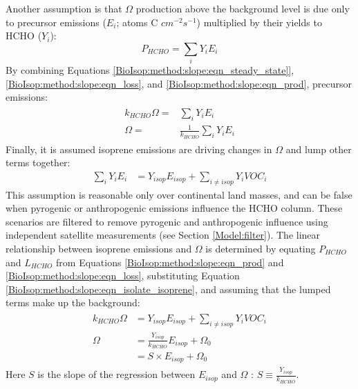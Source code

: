     Another assumption is that $\Omega$ production above the background level is due only to precursor emissions ($E_i$; atoms C $cm^{-2} s^{-1}$) multiplied by their yields to HCHO ($Y_i$):
    \begin{equation}
      \label{BioIsop:method:slope:eqn_prod}
      P_{HCHO}  = \sum_i Y_i E_i 
    \end{equation}
    By combining Equations \ref{BioIsop:method:slope:eqn_steady_state]}, \ref{BioIsop:method:slope:eqn_loss}, and \ref{BioIsop:method:slope:eqn_prod},  precursor emissions:
    \begin{eqnarray} \begin{split}
      k_{HCHO} \Omega = & \sum_i Y_i E_i \\
      \Omega = & \frac{1}{k_{HCHO}} \sum_i Y_i E_i
    \end{split} \end{eqnarray}
    Finally, it is assumed isoprene emissions are driving changes in $\Omega$ \parencite[as assumed elsewhere, e.g.,][]{Palmer2003,Millet2008,Marais2014,Stavrakou2015} and lump other terms together:
    \begin{eqnarray}
      \label{BioIsop:method:slope:eqn_isolate_isoprene}
      \sum_i Y_i E_i  & = Y_{isop} E_{isop} + \sum_{i \ne isop} Y_{i} VOC_{i} 
    \end{eqnarray}
    This assumption is reasonable only over continental land masses, and can be false when pyrogenic or anthropogenic emissions influence the HCHO column.
    These scenarios are filtered to remove pyrogenic and anthropogenic influence using independent satellite measurements (see Section \ref{Model:filter}).
    The linear relationship between isoprene emissions and $\Omega$ is determined by equating $P_{HCHO}$ and $L_{HCHO}$ from Equations \ref{BioIsop:method:slope:eqn_prod} and \ref{BioIsop:method:slope:eqn_loss}, substituting Equation \ref{BioIsop:method:slope:eqn_isolate_isoprene}, and assuming that the lumped terms make up the background:
    \begin{eqnarray} 
      \label{BioIsop:method:slope:eqn_isop_to_hcho}
      \begin{split}
        k_{HCHO}\Omega 
        & = Y_{isop} E_{isop} + \sum_{i \ne isop} Y_{i} VOC_{i} \\
        \Omega 
        & = \frac{Y_{isop}}{k_{HCHO}} E_{isop} + \Omega_0 \\
        & = S \times E_{isop} + \Omega_0
      \end{split} 
    \end{eqnarray}
    Here $S$ is the slope of the regression between $E_{isop}$ and $\Omega$ : $S \equiv \frac{Y_{isop}}{k_{HCHO}}$.
    

